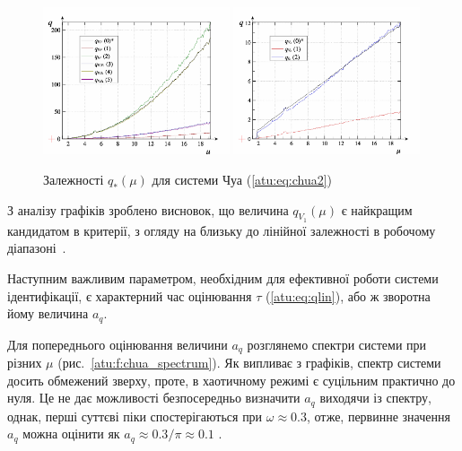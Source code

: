 \begin{figure}[htb!]
\centerline{
  \includegraphics[width=0.49\textwidth]{p/cha/chua/chua_q-p_mu2.png}
  \includegraphics[width=0.49\textwidth]{p/cha/chua/chua_q-p_mu1.png}
}
\caption{Залежності $ q_{*} (\mu) $ для системи Чуа (\ref{atu:eq:chua2})}
\label{atu:f:chua_q}
\end{figure}

З аналізу графіків зроблено висновок, що величина $q_{V_1}(\mu)$
є найкращим кандидатом в критерії, з огляду на близьку до
лінійної залежності в робочому діапазоні~\cite{atu_apir2011}.

Наступним важливим параметром, необхідним для ефективної
роботи системи ідентифікації, є характерний час оцінювання
$ \tau $ (\ref{atu:eq:qlin}), або ж зворотна йому величина
$ a_q $.

Для попереднього оцінювання величини
$ a_q $ розглянемо спектри системи при різних
$ \mu $ (рис.~\ref{atu:f:chua_spectrum}). Як випливає з графіків, спектр системи
досить обмежений зверху, проте, в хаотичному режимі є суцільним
практично до нуля. Це не дає можливості безпосередньо визначити
$ a_q $ виходячи із спектру, однак, перші суттєві піки
спостерігаються при
$ \omega \approx 0.3 $, отже, первинне значення
$ a_q $ можна оцінити як
$ a_q \approx 0.3 / \pi \approx 0.1 $ .


